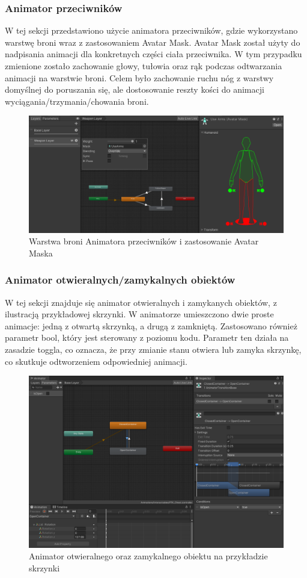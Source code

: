 \subsubsection{Animator przeciwników}
W tej sekcji przedstawiono użycie animatora przeciwników, gdzie wykorzystano warstwę broni wraz z zastosowaniem Avatar Mask. Avatar Mask został użyty do nadpisania animacji dla konkretnych części ciała przeciwnika. W tym przypadku zmienione zostało zachowanie głowy, tułowia oraz rąk podczas odtwarzania animacji na warstwie broni. Celem było zachowanie ruchu nóg z warstwy domyślnej do poruszania się, ale dostosowanie reszty kości do animacji wyciągania/trzymania/chowania broni.
\begin{figure}[h]
    \centering
    \includegraphics[width=1\linewidth]{Images/aiAnimatorController.png}
    \caption{Warstwa broni Animatora przeciwników i zastosowanie Avatar Maska}
\end{figure}

\subsubsection{Animator otwieralnych/zamykalnych obiektów}
W tej sekcji znajduje się animator otwieralnych i zamykanych obiektów, z ilustracją przykładowej skrzynki. W animatorze umieszczono dwie proste animacje: jedną z otwartą skrzynką, a drugą z zamkniętą. Zastosowano również parametr bool, który jest sterowany z poziomu kodu. Parametr ten działa na zasadzie toggla, co oznacza, że przy zmianie stanu otwiera lub zamyka skrzynkę, co skutkuje odtworzeniem odpowiedniej animacji.
\begin{figure}[h]
    \centering
    \includegraphics[scale=0.3]{Images/containerAnimator.png}
    \caption{Animator otwieralnego oraz zamykalnego obiektu na przykładzie skrzynki}
\end{figure}
\FloatBarrier